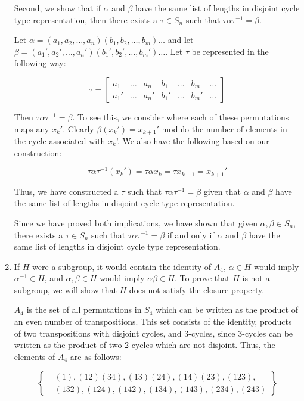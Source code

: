 \documentclass{article}
\begin{document}
\begin{enumerate}
    Second, we show that if $\alpha$ and $\beta$ have the same list of lengths in disjoint cycle type representation, then there exists a $\tau \in S_n$ such that $\tau \alpha \tau^{-1} = \beta$. 

    Let $\alpha = (a_1, a_2, \dots, a_n)(b_1, b_2, \dots, b_m)\dots$ and let \newline $\beta = (a_1', a_2', \dots, a_n')(b_1', b_2', \dots, b_m')\dots$. Let $\tau$ be represented in the following way:

    $$\tau = \begin{bmatrix}
        a_1 & \dots & a_n & b_1 & \dots & b_m & \dots \\
        a_1' & \dots & a_n' & b_1' & \dots & b_m' & \dots 
    \end{bmatrix}$$

    Then $\tau \alpha \tau^{-1} = \beta$. To see this, we consider where each of these permutations maps any $x_k'$. Clearly $\beta(x_k') = x_{k+1}'$ modulo the number of elements in the cycle associated with $x_k$'. We also have the following based on our construction:

    $$\tau \alpha \tau^{-1} (x_k') = \tau \alpha x_k = \tau x_{k+1} = x_{k+1}'$$

    Thus, we have constructed a $\tau$ such that $\tau \alpha \tau^{-1} = \beta$ given that $\alpha$ and $\beta$ have the same list of lengths in disjoint cycle type representation.

    Since we have proved both implications, we have shown that given $\alpha, \beta \in S_n$, there exists a $\tau \in S_n$ such that $\tau \alpha \tau^{-1} = \beta$ if and only if $\alpha$ and $\beta$ have the same list of lengths in disjoint cycle type representation.

    \item If $H$ were a subgroup, it would contain the identity of $A_4$, $\alpha \in H$ would imply $\alpha^{-1} \in H$, and $\alpha, \beta \in H$ would imply $\alpha\beta \in H$. To prove that $H$ is not a subgroup, we will show that $H$ does not satisfy the closure property.

    $A_4$ is the set of all permutations in $S_4$ which can be written as the product of an even number of transpositions. This set consists of the identity, products of two transpositions with disjoint cycles, and 3-cycles, since 3-cycles can be written as the product of two 2-cycles which are not disjoint. Thus, the elements of $A_4$ are as follows:

    $$\left\{\begin{array}{cc}
         &  (1), (12)(34), (13)(24), (14)(23), (123),\\
         &  (132), (124), (142), (134), (143), (234), (243)
    \end{array}\right\}$$


\end{enumerate}
\end{document}
